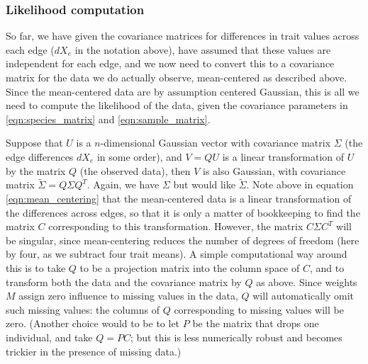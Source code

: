 \documentclass[12pt]{article}
\begin{document}
\subsubsection*{Likelihood computation}

So far, we have given the covariance matrices for differences in trait values across each edge ($dX_e$ in the notation above),
have assumed that these values are independent for each edge,
and we now need to convert this to a covariance matrix for the data we do actually observe,
mean-centered as described above.
Since the mean-centered data are by assumption centered Gaussian, 
this is all we need to compute the likelihood of the data, given the covariance parameters in \eqref{eqn:species_matrix} and \eqref{eqn:sample_matrix}.

Suppose that $U$ is a $n$-dimensional Gaussian vector with covariance matrix $\Sigma$ (the edge differences $dX_e$ in some order),
and $V = Q U$ is a linear transformation of $U$ by the matrix $Q$ (the observed data),
then $V$ is also Gaussian, with covariance matrix $\widetilde \Sigma = Q \Sigma Q^T$.
Again, we have $\Sigma$ but would like $\widetilde \Sigma$.
Note above in equation \eqref{eqn:mean_centering} that the mean-centered data is a linear transformation of the differences across edges,
so that it is only a matter of bookkeeping to find the matrix $C$ corresponding to this transformation.
However, the matrix $C \Sigma C^T$ will be singular, since mean-centering reduces the number of degrees of freedom (here by four, as we subtract four trait means).
A simple computational way around this is to take $Q$ to be a projection matrix into the column space of $C$,
and to transform both the data and the covariance matrix by $Q$ as above.
Since weights $M$ assign zero influence to missing values in the data,
$Q$ will automatically omit such missing values: the columns of $Q$ corresponding to missing values will be zero.
(Another choice would to be to let $P$ be the matrix that drops one individual, and take $Q = PC$; 
but this is less numerically robust
and becomes trickier in the presence of missing data.)
\end{document}
